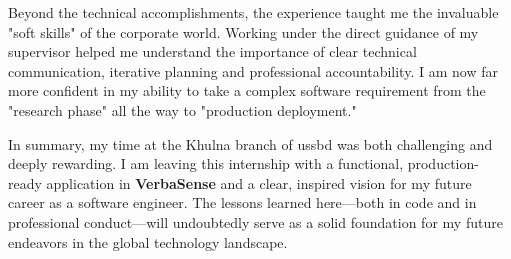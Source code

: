 \documentclass[oneside]{thesis-library}
\begin{document}
Beyond the technical accomplishments, the experience taught me the invaluable "soft skills" of the corporate world. Working under the direct guidance of my supervisor helped me understand the importance of clear technical communication, iterative planning and professional accountability. I am now far more confident in my ability to take a complex software requirement from the "research phase" all the way to "production deployment."

In summary, my time at the Khulna branch of \Gls{ussbd} was both challenging and deeply rewarding. I am leaving this internship with a functional, production-ready application in \textbf{VerbaSense} and a clear, inspired vision for my future career as a software engineer. The lessons learned here—both in code and in professional conduct—will undoubtedly serve as a solid foundation for my future endeavors in the global technology landscape.
\end{document}
